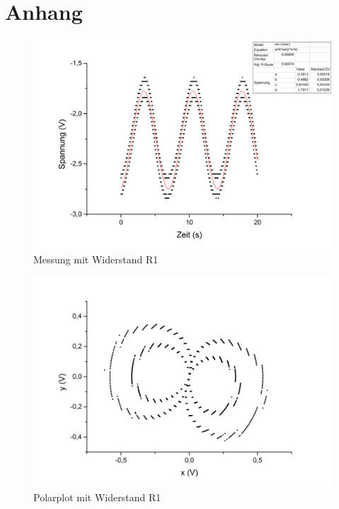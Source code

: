 \clearpage
\section{Anhang}
\begin{figure}[h]
\begin{center}
\includegraphics[scale=0.6]{Bilder/w1}
\caption{Messung mit Widerstand R1}
\end{center}
\end{figure}
\begin{figure}[h]
\begin{center}
\includegraphics[scale=0.6]{Bilder/pw1}
\caption{Polarplot mit Widerstand R1}
\end{center}
\end{figure}
